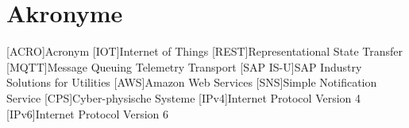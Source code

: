 \section*{Akronyme}            %
\begin{acronym}[SAP IS-U]
  [ACRO]{Acronym}
  [IOT]{Internet of Things}
  [REST]{Representational State Transfer}
  [MQTT]{Message Queuing Telemetry Transport}
  [SAP IS-U]{SAP Industry Solutions for Utilities}
  [AWS]{Amazon Web Services}
  [SNS]{Simple Notification Service}
  [CPS]{Cyber-physische Systeme}
  [IPv4]{Internet Protocol Version 4}
  [IPv6]{Internet Protocol Version 6}


\end{acronym}

\newpage

\listoffigures
{}
\listoftables
{}
\lstlistoflistings
{}
\newpage
